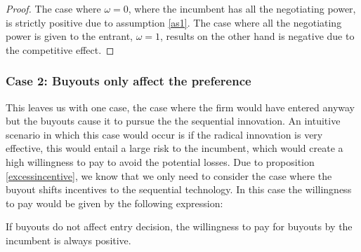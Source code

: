 \begin{proof}
The case where $\omega = 0$, where the incumbent has all the negotiating power, is strictly positive due to assumption \ref{as1}. The case where all the negotiating power is given to the entrant, $\omega = 1$, results on the other hand is negative due to the competitive effect.  
\end{proof}

\subsubsection{Case 2: Buyouts only affect the preference} \label{case:decision}

This leaves us with one case, the case where the firm would have entered anyway but the buyouts cause it to pursue the the sequential innovation. An intuitive scenario in which this case would occur is if the radical innovation is very effective, this would entail a large risk to the incumbent, which would create a high willingness to pay to avoid the potential losses. Due to proposition \ref{excessincentive}, we know that we only need to consider the case where the buyout shifts incentives to the sequential technology. In this case the willingness to pay would be given by the following expression: 
\begin{proposition}
If buyouts do not affect entry decision, the willingness to pay for buyouts by the incumbent is always positive. 
\end{proposition}
